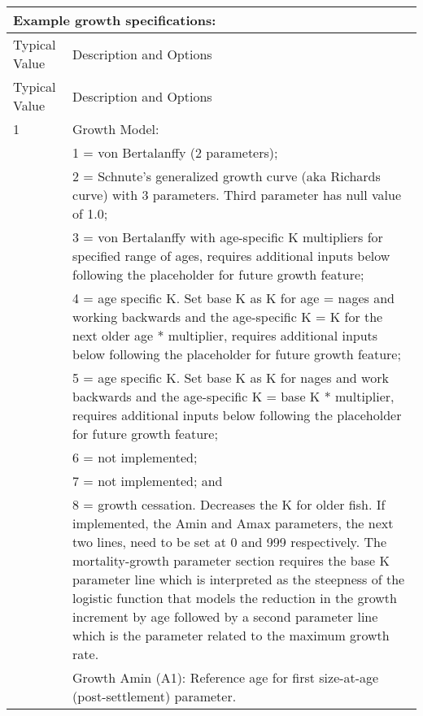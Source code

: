 	
\begin{longtable}{p{0.5cm} p{2cm} p{12cm}}
	\multicolumn{3}{l}{Example growth specifications:} \Tstrut\Bstrut\\
	\hline	
	\multicolumn{2}{l}{Typical Value} & Description and Options\Tstrut\Bstrut\\
	\hline
	\endfirsthead

	\hline
	\multicolumn{2}{l}{Typical Value} & Description and Options\Tstrut\Bstrut\\
	\hline
	\endhead
	\hline

	\endfoot
	
	\endlastfoot

	1 & & Growth Model: \Tstrut\\
	  & & 1 = von Bertalanffy (2 parameters);\\
	  & & 2 = Schnute's generalized growth curve (aka Richards curve) with 3 parameters.  Third parameter has null value of 1.0; \\
	  & & 3 = von Bertalanffy with age-specific K multipliers for specified range of ages, requires additional inputs below following the placeholder for future growth feature;\\
	  & & 4 = age specific K. Set base K as K for age = nages and working backwards and the age-specific K = K for the next older age * multiplier, requires additional inputs below following the placeholder for future growth feature; \\
	  & & 5 = age specific K. Set base K as K for nages and work backwards and the age-specific K = base K * multiplier, requires additional inputs below following the placeholder for future growth feature; \\
	  & & 6 = not implemented; \\
	  & & 7 = not implemented; and \\
	  & & 8 = growth cessation. Decreases the K for older fish. If implemented, the Amin and Amax parameters, the next two lines, need to be set at 0 and 999 respectively. The mortality-growth parameter section requires the base K parameter line which is interpreted as the steepness of the logistic function that models the reduction in the growth increment by age followed by a second parameter line which is the parameter related to the maximum growth rate. \Bstrut \\
	\hline

	\Tstrut 1.66 & & Growth Amin (A1): Reference age for first size-at-age (post-settlement) parameter.\Bstrut\\


\end{longtable}
